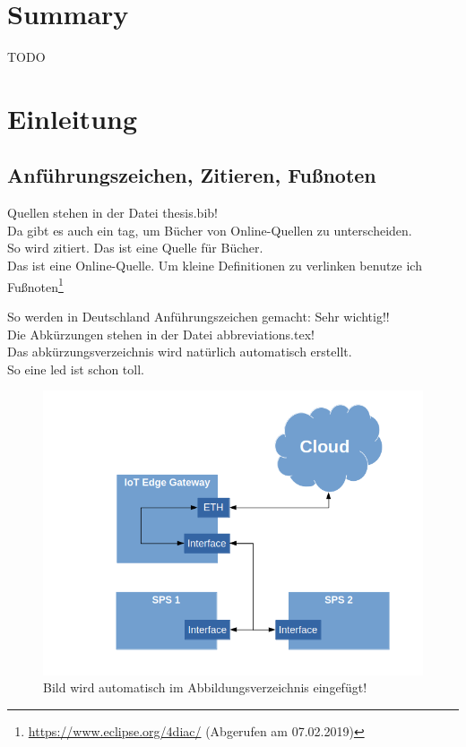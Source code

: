 \chapter{Summary}
TODO



\chapter{Einleitung}
\section{Anführungszeichen, Zitieren, Fußnoten} 
\label{kap:beschda}
Quellen stehen in der Datei thesis.bib!\\
Da gibt es auch ein tag, um Bücher von Online-Quellen zu unterscheiden.\\

So wird zitiert\cite{booktest}. Das ist eine Quelle für Bücher. \\
Das ist eine Online-Quelle\cite{wikimoscow}.
Um kleine Definitionen zu verlinken benutze ich Fußnoten\footnote{\url{ https://www.eclipse.org/4diac/} (Abgerufen am 07.02.2019)}

So werden in Deutschland Anführungszeichen gemacht: \glqq Sehr wichtig!!\grqq{}  \\

Die Abkürzungen stehen in der Datei abbreviations.tex! \\
Das abkürzungsverzeichnis wird natürlich automatisch erstellt.\\

So eine \gls{led} ist schon toll.

\begin{figure}[H]
\includegraphics[scale=0.5]{pictures/GatewayKommunikation.png} 
\caption{Bild wird automatisch im Abbildungsverzeichnis eingefügt!}
\label{fig:gateway}
\end{figure}


